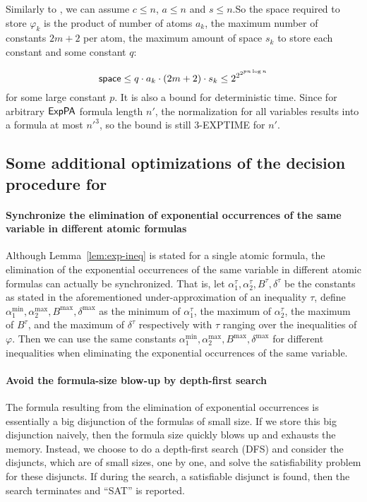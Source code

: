 Similarly to \cite{Oppen73}, we can assume $c\le n$, $a\le n$ and $s\le n$.So the space required to store $\varphi_k$ is the product of number of atoms $a_k$, the maximum number of constants $2m+2$ per atom, the maximum amount of space $s_k$ to store each constant and some constant $q$:
 
$${\sf space}\le q \cdot a_k \cdot (2m+2) \cdot s_k \le 2^{2^{2^{pn \log n}}}$$
for some large constant $p$. It is also a bound for deterministic time.
Since for arbitrary ${\sf ExpPA}$ formula length $n'$, the normalization for all variables results into a formula at most $n'^3$, so the bound is still 3-EXPTIME for $n'$.

\subsection{Some additional optimizations of the decision procedure for {\paexp}}\label{app-opt}

\paragraph{Synchronize the elimination of exponential occurrences of the same variable in different atomic formulas}

Although Lemma~\ref{lem:exp-ineq} is stated for a single atomic formula, the elimination of the exponential occurrences of the same variable in different atomic formulas can actually be synchronized. That is,  let $\alpha^\tau_{1}, \alpha^\tau_{2}, B^\tau, \delta^\tau$ be the constants as stated in the aforementioned under-approximation of an inequality $\tau$, define $\alpha^{\min}_1, \alpha^{\max}_2, B^{\max}, \delta^{\max}$ as the minimum of $\alpha^\tau_1$, the maximum of $\alpha^\tau_2$, the maximum of $B^\tau$, and the maximum of $\delta^\tau$ respectively with $\tau$ ranging over the inequalities of $\varphi$. Then we can use the same constants $\alpha^{\min}_1, \alpha^{\max}_2, B^{\max}, \delta^{\max}$ for different inequalities when eliminating the exponential occurrences of the same variable. 

\paragraph{Avoid the formula-size blow-up by depth-first search}

The {\pa} formula resulting from the elimination of exponential occurrences is essentially a big disjunction of the formulas of small size. If we store this big disjunction naively, then the formula size quickly blows up and exhausts the memory. Instead, we choose to do a depth-first search (DFS) and consider the disjuncts, which are of small sizes, one by one, and solve the satisfiability problem for these disjuncts. If during the search, a satisfiable disjunct is found, then the search terminates and ``SAT'' is reported.

